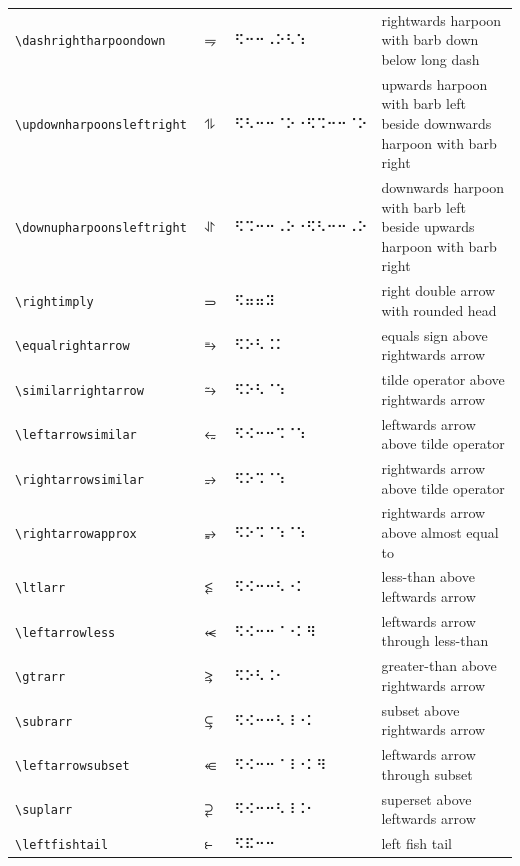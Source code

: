 \documentclass[oneside]{article}
\begin{document}
\begin{longtable}{llll}
\verb|\dashrightharpoondown| & $\dashrightharpoondown$ &   ⠫⠒⠒⠠⠕⠣⠱   & {rightwards harpoon with barb down below long dash} \\[2ex]
\verb|\updownharpoonsleftright| & $\updownharpoonsleftright$ &   ⠫⠣⠒⠒⠈⠕⠐⠫⠩⠒⠒⠈⠕   & \begin{minipage}[t]{8cm}{upwards harpoon with barb left beside downwards harpoon with barb right}
\end{minipage}\\[4ex]
\verb|\downupharpoonsleftright| & $\downupharpoonsleftright$ &   ⠫⠩⠒⠒⠠⠕⠐⠫⠣⠒⠒⠠⠕   & \begin{minipage}[t]{8cm}{downwards harpoon with barb left beside upwards harpoon with barb right}
\end{minipage}\\[4ex]
\verb|\rightimply| & $\rightimply$ &   ⠫⠶⠶⠽   & {right double arrow with rounded head} \\[2ex]
\verb|\equalrightarrow| & $\equalrightarrow$ &   ⠫⠕⠣⠨⠅   & {equals sign above rightwards arrow} \\[2ex]
\verb|\similarrightarrow| & $\similarrightarrow$ &   ⠫⠕⠣⠈⠱   & {tilde operator above rightwards arrow} \\[2ex]
\verb|\leftarrowsimilar| & $\leftarrowsimilar$ &   ⠫⠪⠒⠒⠩⠈⠱   & {leftwards arrow above tilde operator} \\[2ex]
\verb|\rightarrowsimilar| & $\rightarrowsimilar$ &   ⠫⠕⠩⠈⠱   & {rightwards arrow above tilde operator} \\[2ex]
\verb|\rightarrowapprox| & $\rightarrowapprox$ &   ⠫⠕⠩⠈⠱⠈⠱   & {rightwards arrow above almost equal to} \\[2ex]
\verb|\ltlarr| & $\ltlarr$ &   ⠫⠪⠒⠒⠣⠐⠅   & {less-than above leftwards arrow} \\[2ex]
\verb|\leftarrowless| & $\leftarrowless$ &   ⠫⠪⠒⠒⠈⠐⠅⠻   & {leftwards arrow through less-than} \\[2ex]
\verb|\gtrarr| & $\gtrarr$ &   ⠫⠕⠣⠨⠂   & {greater-than above rightwards arrow} \\[2ex]
\verb|\subrarr| & $\subrarr$ &   ⠫⠪⠒⠒⠣⠸⠐⠅   & {subset above rightwards arrow} \\[2ex]
\verb|\leftarrowsubset| & $\leftarrowsubset$ &   ⠫⠪⠒⠒⠈⠸⠐⠅⠻   & {leftwards arrow through subset} \\[2ex]
\verb|\suplarr| & $\suplarr$ &   ⠫⠪⠒⠒⠣⠸⠨⠂   & {superset above leftwards arrow} \\[2ex]
\verb|\leftfishtail| & $\leftfishtail$ &   ⠫⠯⠒⠒   & {left fish tail} \\[2ex]

\end{longtable}
\end{document}
